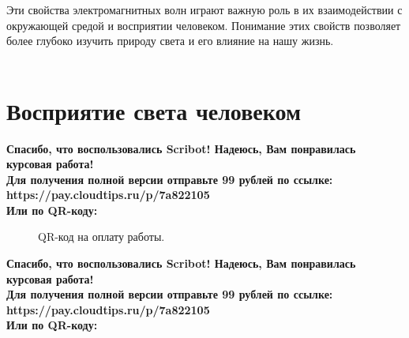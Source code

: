 \documentclass{article}
\begin{document}
Эти свойства электромагнитных волн играют важную роль в их взаимодействии с окружающей средой и восприятии человеком. Понимание этих свойств позволяет более глубоко изучить природу света и его влияние на нашу жизнь.\\
~\\

\newpage

\section{Восприятие света человеком}
\begin{center}
    \textbf{
        Спасибо, что воспользовались Scribot! Надеюсь, Вам понравилась курсовая работа!\\
        Для получения полной версии отправьте 99 рублей по ссылке:\\
        https://pay.cloudtips.ru/p/7a822105\\
        Или по QR-коду:\\
    }
\end{center}
\begin{figure}[h]
    \caption{QR-код на оплату работы.}
    \label{ris:image}
\end{figure}
\newpage
\begin{center}
    \textbf{
        Спасибо, что воспользовались Scribot! Надеюсь, Вам понравилась курсовая работа!\\
        Для получения полной версии отправьте 99 рублей по ссылке:\\
        https://pay.cloudtips.ru/p/7a822105\\
        Или по QR-коду:\\
    }
\end{center}
\end{document}
